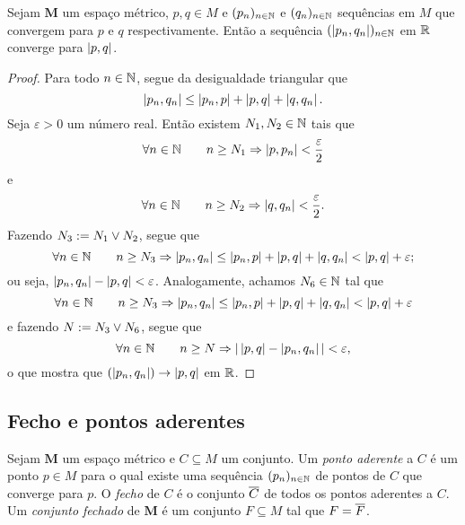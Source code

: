 \begin{proposition}
Sejam $\bm M$ um espaço métrico, $p,q \in M$ e $(p_n)_{n \in \mathbb{N}}$ e $(q_n)_{n \in \mathbb{N}}$ sequências em $M$ que convergem para $p$ e $q$ respectivamente. Então a sequência $(\left\vert{p_n},{q_n}\right\vert)_{n \in \mathbb{N}}$ em $\mathbb{R}$ converge para $\left\vert{p},{q}\right\vert$.
\end{proposition}
\begin{proof}
	Para todo $n \in \mathbb{N}$, segue da desigualdade triangular que
	\begin{equation*}
	\left\vert{p_n},{q_n}\right\vert \leq \left\vert{p_n},{p}\right\vert + \left\vert{p},{q}\right\vert + \left\vert{q},{q_n}\right\vert.
	\end{equation*}
Seja $\varepsilon > 0$ um número real. Então existem $N_1,N_2 \in \mathbb{N}$ tais que
	\begin{equation*}
	\forall n \in \mathbb{N} \qquad n \geq N_1 \Rightarrow \left\vert{p},{p_n}\right\vert < \frac{\varepsilon}{2}
	\end{equation*}
e
	\begin{equation*}
	\forall n \in \mathbb{N} \qquad n \geq N_2 \Rightarrow \left\vert{q},{q_n}\right\vert < \frac{\varepsilon}{2}.
	\end{equation*}
Fazendo $N_3 := N_1 \mathbin{\vee} N_2$, segue que
	\begin{equation*}
	\forall n \in \mathbb{N} \qquad n \geq N_3 \Rightarrow \left\vert{p_n},{q_n}\right\vert \leq \left\vert{p_n},{p}\right\vert + \left\vert{p},{q}\right\vert + \left\vert{q},{q_n}\right\vert < \left\vert{p},{q}\right\vert + \varepsilon;
	\end{equation*}
ou seja, $\left\vert{p_n},{q_n}\right\vert - \left\vert{p},{q}\right\vert < \varepsilon$. Analogamente, achamos $N_6 \in \mathbb{N}$ tal que
	\begin{equation*}
	\forall n \in \mathbb{N} \qquad n \geq N_3 \Rightarrow \left\vert{p_n},{q_n}\right\vert \leq \left\vert{p_n},{p}\right\vert + \left\vert{p},{q}\right\vert + \left\vert{q},{q_n}\right\vert < \left\vert{p},{q}\right\vert + \varepsilon
	\end{equation*}
e fazendo $N := N_3 \mathbin{\vee} N_6$, segue que
	\begin{equation*}
	\forall n \in \mathbb{N} \qquad n \geq N \Rightarrow |\left\vert{p},{q}\right\vert - \left\vert{p_n},{q_n}\right\vert| < \varepsilon,
	\end{equation*}
o que mostra que $(\left\vert{p_n},{q_n}\right\vert) \rightarrow \left\vert{p},{q}\right\vert$ em $\mathbb{R}$.

\end{proof}

\subsection{Fecho e pontos aderentes}

\begin{definition}
Sejam $\bm M$ um espaço métrico e $C \subseteq M$ um conjunto. Um \emph{ponto aderente} a $C$ é um ponto $p \in M$ para o qual existe uma sequência $(p_n)_{n \in \mathbb{N}}$ de pontos de $C$ que converge para $p$. O \emph{fecho} de $C$ é o conjunto $\overline{C}$ de todos os pontos aderentes a $C$. Um \emph{conjunto fechado} de $\bm M$ é um conjunto $F \subseteq M$ tal que $F = \overline{F}$.
\end{definition}

